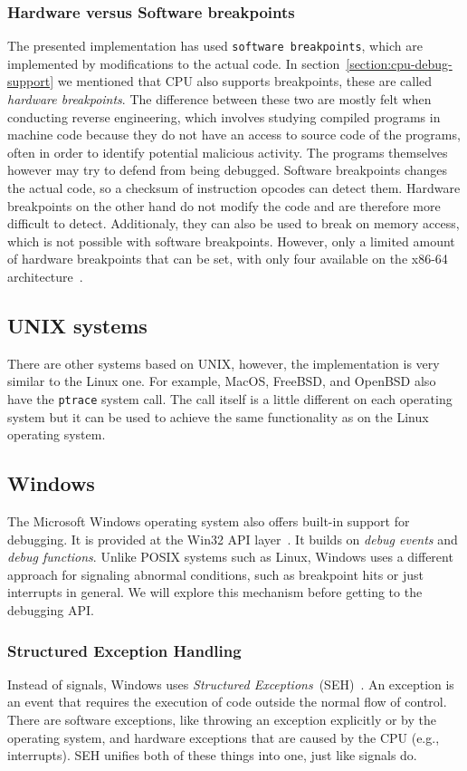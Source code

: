\subsubsection*{Hardware versus Software breakpoints}
The presented implementation has used \texttt{software breakpoints}, which are
implemented by modifications to the actual code. In
section~\ref{section:cpu-debug-support} we mentioned that CPU also supports
breakpoints, these are called \textit{hardware breakpoints}. The difference
between these two are mostly felt when conducting reverse engineering, which
involves studying compiled programs in machine code because they do not have an
access to source code of the programs, often in order to identify potential
malicious activity. The programs themselves however may try to defend from
being debugged. Software breakpoints changes the actual code, so a checksum of
instruction opcodes can detect them. Hardware breakpoints on the other hand do
not modify the code and are therefore more difficult to detect. Additionaly,
they can also be used to break on memory access, which is not possible with
software breakpoints. However, only a limited amount of hardware breakpoints
that can be set, with only four available on the x86-64
architecture~\cite{intel-manual}.

\subsection{UNIX systems}
There are other systems based on UNIX, however, the implementation is very
similar to the Linux one. For example, MacOS, FreeBSD, and OpenBSD also have
the \texttt{ptrace} system call. The call itself is a little different on each
operating system but it can be used to achieve the same functionality as on the
Linux operating system.

\subsection{Windows}
The Microsoft Windows operating system also offers built-in support for
debugging. It is provided at the Win32 API
layer~\cite{windows-msdn-debugging-api, windows-press-debugging-api}. It builds
on \textit{debug events} and \textit{debug functions}. Unlike POSIX systems
such as Linux, Windows uses a different approach for signaling abnormal
conditions, such as breakpoint hits or just interrupts in general. We will
explore this mechanism before getting to the debugging API.

\subsubsection*{Structured Exception Handling}\label{section:seh}
Instead of signals, Windows uses \textit{Structured
Exceptions}~(SEH)~\cite{windows-msdn-seh}. An exception is an event that
requires the execution of code outside the normal flow of control. There are
software exceptions, like throwing an exception explicitly or by the operating
system, and hardware exceptions that are caused by the CPU (e.g., interrupts).
SEH unifies both of these things into one, just like signals do.

